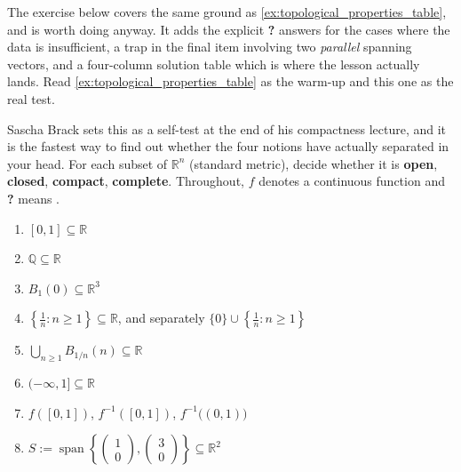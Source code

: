 The exercise below covers the same ground as \cref{ex:topological_properties_table}, and is worth
doing anyway. It adds the explicit \textbf{?} answers for the cases where the data is
insufficient, a trap in the final item involving two \emph{parallel} spanning vectors, and a
four-column solution table which is where the lesson actually lands. Read
\cref{ex:topological_properties_table} as the warm-up and this one as the real test.

\begin{exercise}
\label{ex:classification_table}
Sascha Brack sets this as a self-test at the end of his compactness lecture, and it is the
fastest way to find out whether the four notions have actually separated in your head. For each
subset of $\mathbb{R}^n$ (standard metric), decide whether it is \textbf{open}, \textbf{closed},
\textbf{compact}, \textbf{complete}. Throughout, $f$ denotes a continuous function and
\textbf{?} means .
\begin{enumerate}[label=\textbf{(\alph*)}]
  \item $[0,1] \subseteq \mathbb{R}$
  \item $\mathbb{Q} \subseteq \mathbb{R}$
  \item $B_1(0) \subseteq \mathbb{R}^3$
  \item $\left\{\tfrac1n : n \geq 1\right\} \subseteq \mathbb{R}$, and separately
    $\{0\} \cup \left\{\tfrac1n : n \geq 1\right\}$
  \item $\bigcup_{n\geq1}B_{1/n}(n) \subseteq \mathbb{R}$
  \item $(-\infty,1] \subseteq \mathbb{R}$
  \item $f([0,1])$, \quad $f^{-1}([0,1])$, \quad $f^{-1}\big((0,1)\big)$
  \item $S := \operatorname{span}\!\left\{\begin{pmatrix}1\\0\end{pmatrix},
    \begin{pmatrix}3\\0\end{pmatrix}\right\} \subseteq \mathbb{R}^2$
\end{enumerate}
\end{exercise}

